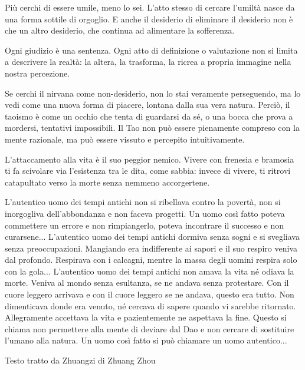 \documentclass[12pt]{book} %
\begin{document}
Più cerchi di essere umile, meno lo sei. L’atto stesso di cercare l’umiltà nasce da una forma sottile di orgoglio.
E anche il desiderio di eliminare il desiderio non è che un altro desiderio, che continua ad alimentare la sofferenza.

Ogni giudizio è una sentenza.
Ogni atto di definizione o valutazione non si limita a descrivere la realtà: la altera, la trasforma, la ricrea a propria immagine nella nostra percezione.

Se cerchi il nirvana come non-desiderio, non lo stai veramente perseguendo, ma lo vedi come una nuova forma di piacere, lontana dalla sua vera natura. Perciò, il taoismo è come un occhio che tenta di guardarsi da sé, o una bocca che prova a mordersi, tentativi impossibili. Il Tao non può essere pienamente compreso con la mente razionale, ma può essere vissuto e percepito intuitivamente.

L’attaccamento alla vita è il suo peggior nemico.
Vivere con frenesia e bramosia ti fa scivolare via l’esistenza tra le dita, come sabbia: invece di vivere, ti ritrovi catapultato verso la morte senza nemmeno accorgertene.

\begin{mdframed}[linewidth=1pt]
L’autentico uomo dei tempi antichi non si ribellava contro la povertà, non si inorgogliva dell’abbondanza e non faceva progetti. Un uomo così fatto poteva commettere un errore e non rimpiangerlo, poteva incontrare il successo e non curarsene... L’autentico uomo dei tempi antichi dormiva senza sogni e si svegliava senza preoccupazioni. Mangiando era indifferente ai sapori e il suo respiro veniva dal profondo. Respirava con i calcagni, mentre la massa degli uomini respira solo con la gola... L’autentico uomo dei tempi antichi non amava la vita né odiava la morte. Veniva al mondo senza esultanza, se ne andava senza protestare. Con il cuore leggero arrivava e con il cuore leggero se ne andava, questo era tutto. Non dimenticava donde era venuto, né cercava di sapere quando vi sarebbe ritornato. Allegramente accettava la vita e pazientemente ne aspettava la fine. Questo si chiama non permettere alla mente di deviare dal Dao e non cercare di sostituire l’umano alla natura. Un uomo così fatto si può chiamare un uomo autentico...

Testo tratto da Zhuangzi di Zhuang Zhou 
\end{mdframed}
\end{document}
